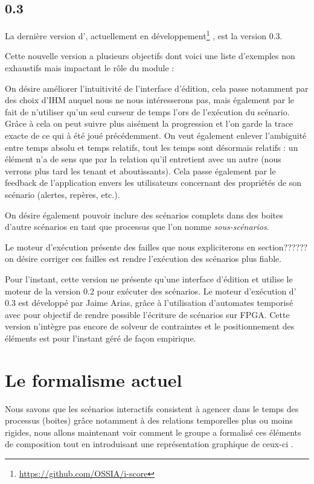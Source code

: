 \subsection{\iscore{} 0.3}%

La dernière version d'\iscore{}, actuellement en développement\footnote{\url{https://github.com/OSSIA/i-score}} \iscore{}, est la version 0.3.

Cette nouvelle version a plusieurs objectifs dont voici une liste d'exemples non exhaustifs mais impactant le rôle du module \csp{} :

On désire améliorer l'intuitivité de l'interface d'édition, cela passe notamment par des choix d'IHM auquel nous ne nous intéresserons pas, mais également par le fait de n'utiliser qu'un seul curseur de temps l'ors de l'exécution du scénario. Grâce à cela on peut suivre plus aisément la progression et l'on garde la trace exacte de ce qui à été joué précédemment. On veut également enlever l'ambiguité entre temps absolu et temps relatifs, tout les temps sont désormais relatifs : un élément n'a de sens que par la relation qu'il entretient avec un autre (nous verrons plus tard les tenant et aboutissants).
Cela passe également par le feedback de l'application envers les utilisateurs concernant des propriétés de son scénario (alertes, repères, etc.).

On désire également pouvoir inclure des scénarios complets dans des boites d'autre scénarios en tant que processus que l'on nomme \emph{sous-scénarios}.

Le moteur d'exécution présente des failles que nous expliciterons en section?????? on désire corriger ces failles est rendre l'exécution des scénarios plus fiable.

Pour l'instant, cette version ne présente qu'une interface d'édition et utilise le moteur de la version 0.2 pour exécuter des scénarios. Le moteur d'exécution d'\iscore{} 0.3 est développé par Jaime Arias, grâce à l'utilisation d'automates temporisé avec pour objectif de rendre possible l'écriture de scénarios sur FPGA.
Cette version n'intègre pas encore de solveur de contraintes et le positionnement des éléments est pour l'instant géré de façon empirique.

\section{Le formalisme actuel}

Nous savons que les scénarios interactifs consistent à agencer dans le temps des processus (boites) grâce notamment à des relations temporelles plus ou moins rigides, nous allons maintenant voir comment le groupe \ossia{} a formalisé ces éléments de composition tout en introduisant une représentation graphique de ceux-ci .

